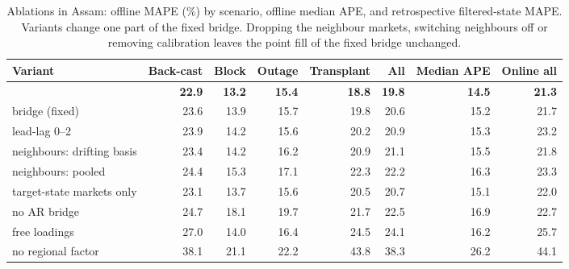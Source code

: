 \begin{table}[tbp]
\caption{Ablations in Assam: offline MAPE (\%) by scenario, offline median APE, and retrospective filtered-state MAPE. Variants change one part of the fixed bridge. Dropping the neighbour markets, switching neighbours off or removing calibration leaves the point fill of the fixed bridge unchanged.}
\label{tab:ablation}
\small
\begin{tabular}{lrrrrrrr}
\toprule
Variant & Back-cast & Block & Outage & Transplant & All & Median APE & Online all \\
\midrule
\auto{} & \textbf{22.9} & \textbf{13.2} & \textbf{15.4} & \textbf{18.8} & \textbf{19.8} & \textbf{14.5} & \textbf{21.3} \\
bridge (fixed) & 23.6 & 13.9 & 15.7 & 19.8 & 20.6 & 15.2 & 21.7 \\
lead-lag 0--2 & 23.9 & 14.2 & 15.6 & 20.2 & 20.9 & 15.3 & 23.2 \\
neighbours: drifting basis & 23.4 & 14.2 & 16.2 & 20.9 & 21.1 & 15.5 & 21.8 \\
neighbours: pooled & 24.4 & 15.3 & 17.1 & 22.3 & 22.2 & 16.3 & 23.3 \\
target-state markets only & 23.1 & 13.7 & 15.6 & 20.5 & 20.7 & 15.1 & 22.0 \\
no AR bridge & 24.7 & 18.1 & 19.7 & 21.7 & 22.5 & 16.9 & 22.7 \\
free loadings & 27.0 & 14.0 & 16.4 & 24.5 & 24.1 & 16.2 & 25.7 \\
no regional factor & 38.1 & 21.1 & 22.2 & 43.8 & 38.3 & 26.2 & 44.1 \\
\bottomrule
\end{tabular}
\end{table}
